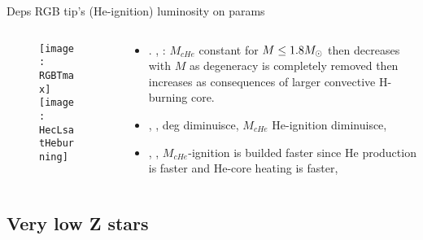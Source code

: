 \begin{frame}{Deps RGB tip's (He-ignition) luminosity on params}
\begin{columns}[T]\begin{column}{0.5\textwidth}
\begin{figure}[!ht]
\texttt{[image: RGBTmax]}\label{fig:RGBTmax}
\texttt{[image: HecLsatHeburning]}\label{fig:HecLsatHeburning}
\end{figure}
\end{column}
\begin{column}{0.45\textwidth}
\begin{itemize}
    \item {}. , : $M_{cHe}$ constant for $M\leq1.8M_{\odot}{}$ then decreases with $M$ as degeneracy is completely removed then increases as consequences of larger convective H-burning core.
    \item {}, , deg \Pelectron diminuisce, $M_{cHe}$ He-ignition diminuisce, 
    \item {}, , $M_{cHe}$-ignition is builded faster since He production is faster and He-core heating is faster, 
\end{itemize}
\end{column}\end{columns}
\end{frame}

\subsection{Very low Z stars}

